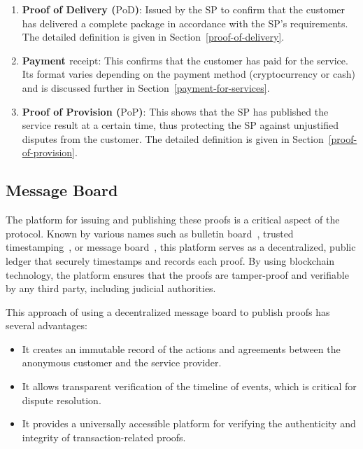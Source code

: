 \documentclass[pdftex,twocolumn,epjc3]{svjour3}
\begin{document}
\begin{enumerate}
  \item \textbf{Proof of Delivery ($\textrm{PoD}$)}: Issued by the SP to confirm that the customer has delivered a complete package in accordance with the SP's requirements. The detailed definition is given in Section~\ref{proof-of-delivery}.
  
  \item \textbf{Payment $\textrm{receipt}$}: This confirms that the customer has paid for the service. Its format varies depending on the payment method (cryptocurrency or cash) and is discussed further in Section~\ref{payment-for-services}.
  
  \item \textbf{Proof of Provision ($\textrm{PoP}$)}: This shows that the SP has published the service result at a certain time, thus protecting the SP against unjustified disputes from the customer. The detailed definition is given in Section~\ref{proof-of-provision}.
\end{enumerate}

\subsection{Message Board}\label{sec:message-board}
The platform for issuing and publishing these proofs is a critical aspect of the protocol. Known by various names such as bulletin board~\cite{achenbachImprovedCoercionresistantElectronic2015}, trusted timestamping~\cite{gippDecentralizedTrustedTimestamping2015}, or message board~\cite{hinarejosSolutionSecureCertified2019}, this platform serves as a decentralized, public ledger that securely timestamps and records each proof. By using blockchain technology, the platform ensures that the proofs are tamper-proof and verifiable by any third party, including judicial authorities.

This approach of using a decentralized message board to publish proofs has several advantages:
\begin{itemize}
  \item It creates an immutable record of the actions and agreements between the anonymous customer and the service provider.
  \item It allows transparent verification of the timeline of events, which is critical for dispute resolution.
\item It provides a universally accessible platform for verifying the authenticity and integrity of transaction-related proofs.
\end{itemize}
\end{document}
